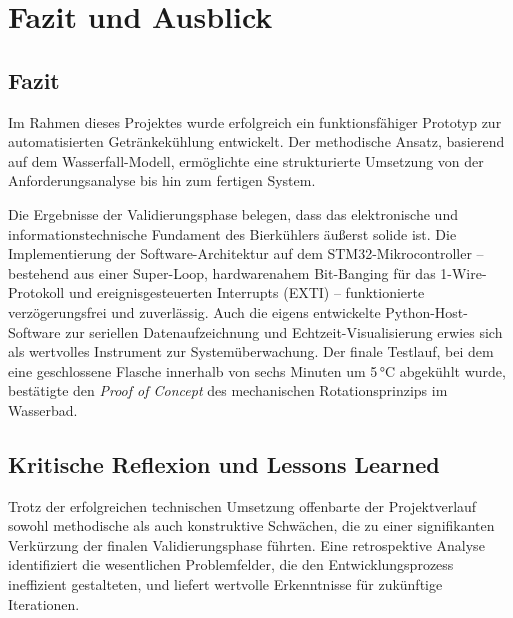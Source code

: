 \chapter{Fazit und Ausblick}
\label{cha:fazit}

\section{Fazit}
Im Rahmen dieses Projektes wurde erfolgreich ein funktionsfähiger Prototyp zur automatisierten Getränkekühlung entwickelt. Der methodische Ansatz, basierend auf dem Wasserfall-Modell, ermöglichte eine strukturierte Umsetzung von der Anforderungsanalyse bis hin zum fertigen System. 

Die Ergebnisse der Validierungsphase belegen, dass das elektronische und informationstechnische Fundament des Bierkühlers äußerst solide ist. Die Implementierung der Software-Architektur auf dem STM32-Mikrocontroller – bestehend aus einer Super-Loop, hardwarenahem Bit-Banging für das 1-Wire-Protokoll und ereignisgesteuerten Interrupts (EXTI) – funktionierte verzögerungsfrei und zuverlässig. Auch die eigens entwickelte Python-Host-Software zur seriellen Datenaufzeichnung und Echtzeit-Visualisierung erwies sich als wertvolles Instrument zur Systemüberwachung. Der finale Testlauf, bei dem eine geschlossene Flasche innerhalb von sechs Minuten um 5\,°C abgekühlt wurde, bestätigte den \textit{Proof of Concept} des mechanischen Rotationsprinzips im Wasserbad.

\section{Kritische Reflexion und Lessons Learned}
Trotz der erfolgreichen technischen Umsetzung offenbarte der Projektverlauf sowohl methodische als auch konstruktive Schwächen, die zu einer signifikanten Verkürzung der finalen Validierungsphase führten. Eine retrospektive Analyse identifiziert die wesentlichen Problemfelder, die den Entwicklungsprozess ineffizient gestalteten, und liefert wertvolle Erkenntnisse für zukünftige Iterationen.


